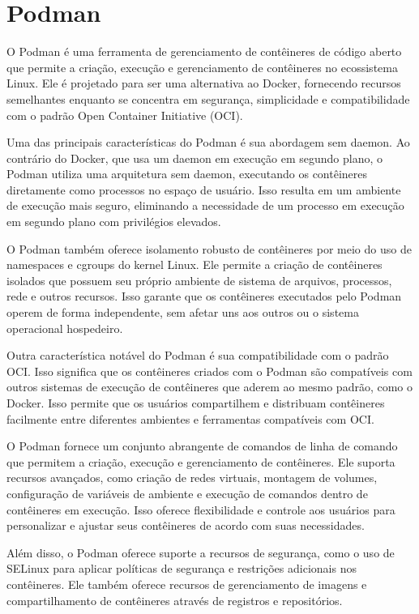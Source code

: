 \section{Podman}

O Podman é uma ferramenta de gerenciamento de contêineres de código aberto que permite a criação, execução e gerenciamento de contêineres no ecossistema Linux. Ele é projetado para ser uma alternativa ao Docker, fornecendo recursos semelhantes enquanto se concentra em segurança, simplicidade e compatibilidade com o padrão Open Container Initiative (OCI).

Uma das principais características do Podman é sua abordagem sem daemon. Ao contrário do Docker, que usa um daemon em execução em segundo plano, o Podman utiliza uma arquitetura sem daemon, executando os contêineres diretamente como processos no espaço de usuário. Isso resulta em um ambiente de execução mais seguro, eliminando a necessidade de um processo em execução em segundo plano com privilégios elevados.

O Podman também oferece isolamento robusto de contêineres por meio do uso de namespaces e cgroups do kernel Linux. Ele permite a criação de contêineres isolados que possuem seu próprio ambiente de sistema de arquivos, processos, rede e outros recursos. Isso garante que os contêineres executados pelo Podman operem de forma independente, sem afetar uns aos outros ou o sistema operacional hospedeiro.

Outra característica notável do Podman é sua compatibilidade com o padrão OCI. Isso significa que os contêineres criados com o Podman são compatíveis com outros sistemas de execução de contêineres que aderem ao mesmo padrão, como o Docker. Isso permite que os usuários compartilhem e distribuam contêineres facilmente entre diferentes ambientes e ferramentas compatíveis com OCI.

O Podman fornece um conjunto abrangente de comandos de linha de comando que permitem a criação, execução e gerenciamento de contêineres. Ele suporta recursos avançados, como criação de redes virtuais, montagem de volumes, configuração de variáveis de ambiente e execução de comandos dentro de contêineres em execução. Isso oferece flexibilidade e controle aos usuários para personalizar e ajustar seus contêineres de acordo com suas necessidades.

Além disso, o Podman oferece suporte a recursos de segurança, como o uso de SELinux para aplicar políticas de segurança e restrições adicionais nos contêineres. Ele também oferece recursos de gerenciamento de imagens e compartilhamento de contêineres através de registros e repositórios.
